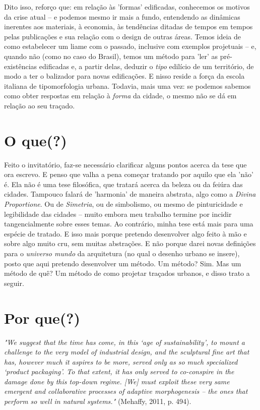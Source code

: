 \documentclass[]{report}
\begin{document}
Dito isso, reforço que: em relação às 'formas' edificadas, conhecemos os motivos da crise atual  – e podemos mesmo ir mais a fundo, entendendo as dinâmicas inerentes aos materiais, à economia, às tendências ditadas de tempos em tempos pelas publicações e sua relação com o design de outras áreas. Temos ideia de como estabelecer um liame com o passado, inclusive com exemplos projetuais – e, quando não (como no caso do Brasil), temos um método para 'ler' as pré-existências edificadas e, a partir delas, deduzir o \textit{tipo} edilício de um território, de modo a ter o balizador para novas edificações. E nisso reside a força da escola italiana de tipomorfologia urbana. Todavia, mais uma vez: se podemos sabemos como obter respostas em relação à \textit{forma} da cidade, o mesmo não se dá em relação ao seu traçado.

\section{O que(?)}

Feito o invitatório, faz-se necessário clarificar alguns pontos acerca da tese que ora escrevo. E penso que valha a pena começar tratando por aquilo que ela 'não' é. Ela não é uma tese filosófica, que tratará acerca da beleza ou da feiúra das cidades. Tampouco falará de 'harmonia' de maneira abstrata, algo como a \textit{Divina Proportione}. Ou de \textit{Simetria}, ou de simbolismo, ou mesmo de pinturicidade e legibilidade das cidades – muito embora meu trabalho termine por incidir tangencialmente sobre esses temas. Ao contrário, minha tese está mais para uma espécie de tratado. E isso mais porque pretendo desenvolver algo feito à mão e sobre algo muito cru, sem muitas abstrações. E não porque darei novas definições para o \textit{universo mundo} da arquitetura (no qual o desenho urbano se insere), posto que aqui pretendo desenvolver um método. Um método? Sim. Mas um método de quê? Um método de como projetar traçados urbanos, e disso trato a seguir.

\section{Por que(?)}


\textit{"We suggest that the time has come, in this ‘age of sustainability’, to mount a challenge to the very model of industrial design, and the sculptural fine art that has, however much it aspires to be more, served only as so much specialized ‘product packaging’. To that extent, it has only served to co-conspire in the damage done by this top-down regime. [We] must exploit these very same emergent and collaborative processes of adaptive morphogenesis – the ones that perform so well in natural systems."} (Mehaffy, 2011, p. 494).
\end{document}
